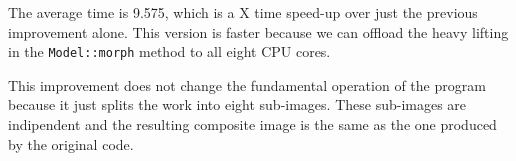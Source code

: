 \documentclass[12pt]{article}
\begin{document}
The average time is 9.575, which is a X time speed-up over just the previous improvement alone. This version
is faster because we can offload the heavy lifting in the \texttt{Model::morph} method to all eight CPU cores.

This improvement does not change the fundamental operation of the program because it just splits the work
into eight sub-images. These sub-images are indipendent and the resulting composite image is the same
as the one produced by the original code.
\end{document}
